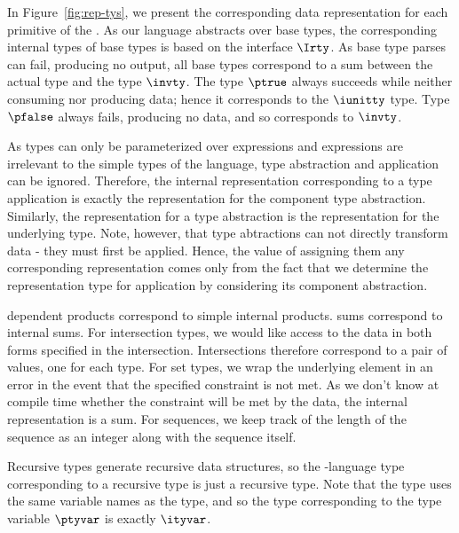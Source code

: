 In Figure~\ref{fig:rep-tys}, we present the corresponding data
representation for each primitive of the \ddc{}. As our language
abstracts over base types, the corresponding internal types of base
types is based on the interface $\Irty$. As base type parses can fail,
producing no output, all base types correspond to a sum between the
actual type and the type $\invty$. The \ddc{} type $\ptrue$ always
succeeds while neither consuming nor producing data; hence it
corresponds to the $\iunitty$ type. Type $\pfalse$ always fails,
producing no data, and so corresponds to $\invty$.

As types can only be parameterized over expressions and expressions
are irrelevant to the simple types of the \implang{} language, type
abstraction and application can be ignored. Therefore, the internal
representation corresponding to a type application is exactly the
representation for the component type abstraction.  Similarly, the
representation for a type abstraction is the representation for the
underlying type. Note, however, that type abtractions can not directly
transform data - they must first be applied. Hence, the value of
assigning them any corresponding representation comes only from the
fact that we determine the representation type for application by
considering its component abstraction.

\ddc{} dependent products correspond to simple internal products.  \ddc{}
sums correspond to internal sums.
For intersection types, we would like access to the data in both forms
specified in the intersection.  Intersections therefore correspond to
a pair of values, one for each type. For set types, we wrap the
underlying element in an error in the event that the specified
constraint is not met. As we don't know at compile time whether the
constraint will be met by the data, the internal representation is a
sum. For sequences, we keep track of the length of the sequence as an
integer along with the sequence itself.

Recursive types generate recursive data structures, so the
\implang{}-language type corresponding to a recursive \ddc{} type is
just a recursive \implang{} type. Note that the \implang{} type uses the same
variable names as the \ddc{} type, and so the type corresponding to
the type variable $\ptyvar$ is exactly $\ityvar$.

